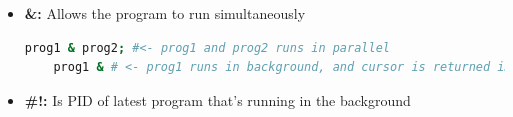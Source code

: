 \documentclass[12pt]{article}
\begin{document}
\bigskip

\section*{}

\bigskip

\begin{itemize}
    \item \textbf{\&:} Allows the program to run simultaneously

    \begin{lstlisting}[language=bash]
    prog1 & prog2; #<- prog1 and prog2 runs in parallel
    prog1 & # <- prog1 runs in background, and cursor is returned immediately
    \end{lstlisting}

    \item \textbf{\#!:} Is PID of latest program that's running in the background

\end{itemize}
\end{document}
